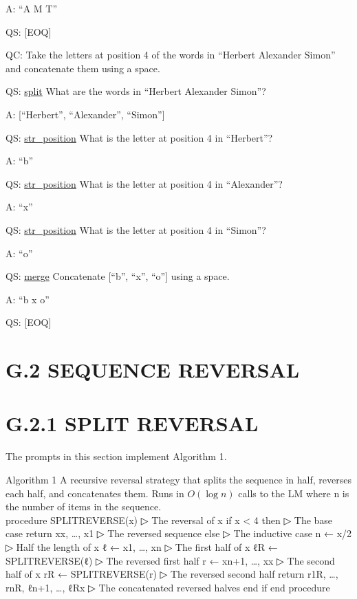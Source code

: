 \documentclass[
]{article}
\begin{document}
A: ``A M T''

QS: {[}EOQ{]}

QC: Take the letters at position 4 of the words in ``Herbert Alexander
Simon'' and concatenate them using a space.

QS: \hyperref[split]{split} What are the words in ``Herbert Alexander
Simon''?

A: {[}``Herbert'', ``Alexander'', ``Simon''{]}

QS: \hyperref[str_position]{str\_position} What is the letter at
position 4 in ``Herbert''?

A: ``b''

QS: \hyperref[str_position]{str\_position} What is the letter at
position 4 in ``Alexander''?

A: ``x''

QS: \hyperref[str_position]{str\_position} What is the letter at
position 4 in ``Simon''?

A: ``o''

QS: \hyperref[merge]{merge} Concatenate {[}``b'', ``x'', ``o''{]} using
a space.

A: ``b x o''

QS: {[}EOQ{]}

\section{G.2 SEQUENCE REVERSAL}\label{g.2-sequence-reversal}

\section{G.2.1 SPLIT REVERSAL}\label{g.2.1-split-reversal}

The prompts in this section implement Algorithm 1.

Algorithm 1 A recursive reversal strategy that splits the sequence in
half, reverses each half, and concatenates them. Runs in \(O(\log n)\)
calls to the LM where n is the number of items in the sequence.\\
procedure SPLITREVERSE(x) ▷ The reversal of x if \textbar x\textbar{}
\textless{} 4 then ▷ The base case return x\textbar x\textbar, \ldots,
x1 ▷ The reversed sequence else ▷ The inductive case n ←
\textbar x\textbar/2 ▷ Half the length of x ℓ ← x1, \ldots, xn ▷ The
first half of x ℓR ← SPLITREVERSE(ℓ) ▷ The reversed first half r ← xn+1,
\ldots, x\textbar x\textbar{} ▷ The second half of x rR ←
SPLITREVERSE(r) ▷ The reversed second half return r1R, \ldots, rnR,
ℓn+1, \ldots, ℓR\textbar x\textbar{} ▷ The concatenated reversed halves
end if end procedure
\end{document}
